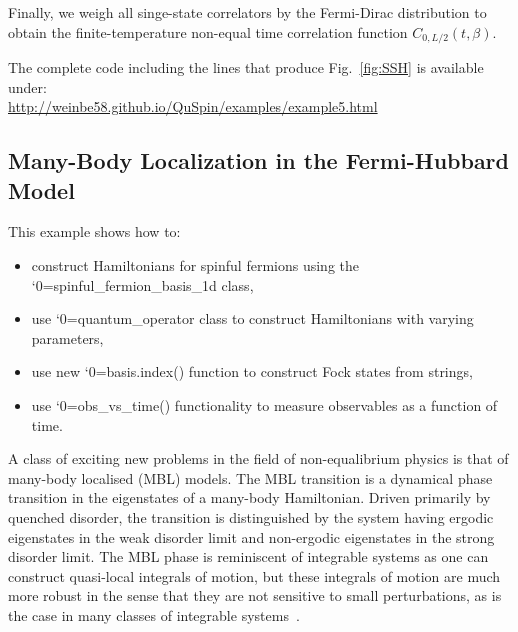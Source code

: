 \documentclass{SciPost}
\newcommand\0{\scalebox{-1}[1]{0}}
\let\svttfamily\ttfamily
\renewcommand\ttfamily{\svttfamily\catcode`0=\active }
\renewcommand\texttt{\bgroup\ttfamily\texttthelp}
\def\texttthelp#1{#1\egroup}
\newcommand{\SSHcode}{example5.py}
\begin{document}

Finally, we weigh all singe-state correlators by the Fermi-Dirac distribution to obtain the finite-temperature non-equal time correlation function $C_{0,L/2}(t,\beta)$.


The complete code including the lines that produce Fig.~\ref{fig:SSH} is available under:\\

\href{http://weinbe58.github.io/QuSpin/examples/example5.html}{http://weinbe58.github.io/QuSpin/examples/example5.html}\\



\subsection{Many-Body Localization in the Fermi-Hubbard Model}
\label{subsec:Fermion_MBL}

This example shows how to:
\begin{itemize}
	\item construct Hamiltonians for spinful fermions using the \texttt{spinful\_fermion\_basis\_1d} class,
	\item use \texttt{quantum\_operator} class to construct Hamiltonians with varying parameters,
	\item use new \texttt{basis.index()} function to construct Fock states from strings,
	\item use \texttt{obs\_vs\_time()} functionality to measure observables as a function of time.
\end{itemize}

A class of exciting new problems in the field of non-equalibrium physics is that of many-body localised (MBL) models. The MBL transition is a dynamical phase transition in the eigenstates of a many-body Hamiltonian. Driven primarily by quenched disorder, the transition is distinguished by the system having ergodic eigenstates in the weak disorder limit and non-ergodic eigenstates in the strong disorder limit. The MBL phase is reminiscent of integrable systems as one can construct quasi-local integrals of motion, but these integrals of motion are much more robust in the sense that they are not sensitive to small perturbations, as is the case in many classes of integrable systems~\cite{nandkishore_15,abanin_17,khemani_16,khemani_17,ponte_17}.
\end{document}
